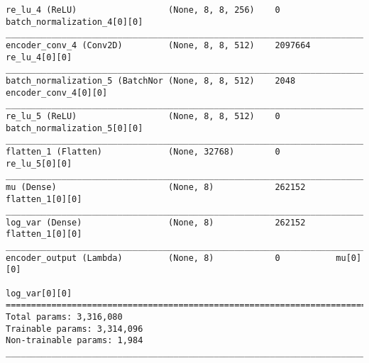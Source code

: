 \begin{lstlisting}[caption={CelebA-VAE Encoder},captionpos=b,basicstyle=\tiny, label={lst:mnist-vae-encoder}]
re_lu_4 (ReLU)                  (None, 8, 8, 256)    0           batch_normalization_4[0][0]
__________________________________________________________________________________________________
encoder_conv_4 (Conv2D)         (None, 8, 8, 512)    2097664     re_lu_4[0][0]
__________________________________________________________________________________________________
batch_normalization_5 (BatchNor (None, 8, 8, 512)    2048        encoder_conv_4[0][0]
__________________________________________________________________________________________________
re_lu_5 (ReLU)                  (None, 8, 8, 512)    0           batch_normalization_5[0][0]
__________________________________________________________________________________________________
flatten_1 (Flatten)             (None, 32768)        0           re_lu_5[0][0]
__________________________________________________________________________________________________
mu (Dense)                      (None, 8)            262152      flatten_1[0][0]
__________________________________________________________________________________________________
log_var (Dense)                 (None, 8)            262152      flatten_1[0][0]
__________________________________________________________________________________________________
encoder_output (Lambda)         (None, 8)            0           mu[0][0]
                                                                 log_var[0][0]
==================================================================================================
Total params: 3,316,080
Trainable params: 3,314,096
Non-trainable params: 1,984
__________________________________________________________________________________________________
\end{lstlisting}
